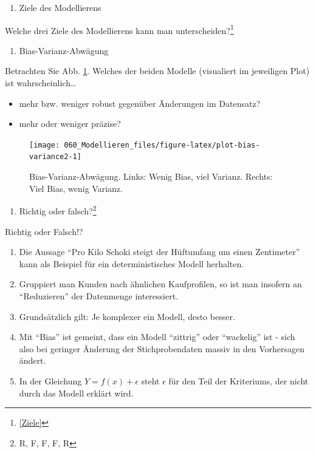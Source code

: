 \documentclass[12pt,ngerman,]{book}
\providecommand{\tightlist}{%
  \setlength{\itemsep}{0pt}\setlength{\parskip}{0pt}}
\let\rmarkdownfootnote\footnote%
\def\footnote{\protect\rmarkdownfootnote}
\theoremstyle{definition}
\theoremstyle{definition}
\theoremstyle{remark}
\let\BeginKnitrBlock\begin \let\EndKnitrBlock\end
\begin{document}
\begin{enumerate}
\def\labelenumi{\arabic{enumi}.}
\setcounter{enumi}{1}
\tightlist
\item
  Ziele des Modellierens
\end{enumerate}

Welche drei Ziele des Modellierens kann man unterscheiden?\footnote{\ref{Ziele}}

\begin{enumerate}
\def\labelenumi{\arabic{enumi}.}
\setcounter{enumi}{2}
\tightlist
\item
  Bias-Varianz-Abwägung
\end{enumerate}

Betrachten Sie Abb. \ref{fig:plot-bias-variance2}. Welches der beiden
Modelle (visualiert im jeweiligen Plot) ist wahrscheinlich\ldots{}

\begin{itemize}
\tightlist
\item
  mehr bzw. weniger robust gegenüber Änderungen im Datensatz?
\item
  mehr oder weniger präzise?
\end{itemize}

\begin{figure}

{\centering \texttt{[image: 060\_Modellieren\_files/figure-latex/plot-bias-variance2-1]} 

}

\caption{Bias-Varianz-Abwägung. Links: Wenig Bias, viel Varianz. Rechts: Viel Bias, wenig Varianz.}\label{fig:plot-bias-variance2}
\end{figure}

\begin{enumerate}
\def\labelenumi{\arabic{enumi}.}
\setcounter{enumi}{3}
\tightlist
\item
  Richtig oder falsch?\footnote{R, F, F, F, R}
\end{enumerate}

\BeginKnitrBlock{rmdexercises}
Richtig oder Falsch!?

\begin{enumerate}
\def\labelenumi{\arabic{enumi}.}
\tightlist
\item
  Die Aussage ``Pro Kilo Schoki steigt der Hüftumfang um einen
  Zentimeter'' kann als Beispiel für ein deterministisches Modell
  herhalten.
\item
  Gruppiert man Kunden nach ähnlichen Kaufprofilen, so ist man insofern
  an ``Reduzieren'' der Datenmenge interessiert.
\item
  Grundsätzlich gilt: Je komplexer ein Modell, desto besser.
\item
  Mit ``Bias'' ist gemeint, dass ein Modell ``zittrig'' oder
  ``wackelig'' ist - sich also bei geringer Änderung der
  Stichprobendaten massiv in den Vorhersagen ändert.
\item
  In der Gleichung \(Y=f(x)+\epsilon\) steht \(\epsilon\) für den Teil
  der Kriteriums, der nicht durch das Modell erklärt wird.
\end{enumerate}
\EndKnitrBlock{rmdexercises}
\end{document}
